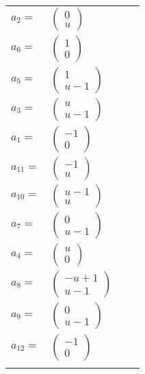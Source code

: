 \documentclass[1p]{elsarticle_modified}
\theoremstyle{definition}
\begin{document}
\begin{tabular}{m{7pt} m{180pt} m{7pt} m{180pt} }
\flushright $a_{2}=$&$\begin{pmatrix}0\\u\end{pmatrix}$ \\
\flushright $a_{6}=$&$\begin{pmatrix}1\\0\end{pmatrix}$ \\
\flushright $a_{5}=$&$\begin{pmatrix}1\\u-1\end{pmatrix}$ \\
\flushright $a_{3}=$&$\begin{pmatrix}u\\u-1\end{pmatrix}$ \\
\flushright $a_{1}=$&$\begin{pmatrix}-1\\0\end{pmatrix}$ \\
\flushright $a_{11}=$&$\begin{pmatrix}-1\\u\end{pmatrix}$ \\
\flushright $a_{10}=$&$\begin{pmatrix}u-1\\u\end{pmatrix}$ \\
\flushright $a_{7}=$&$\begin{pmatrix}0\\u-1\end{pmatrix}$ \\
\flushright $a_{4}=$&$\begin{pmatrix}u\\0\end{pmatrix}$ \\
\flushright $a_{8}=$&$\begin{pmatrix}- u+1\\u-1\end{pmatrix}$ \\
\flushright $a_{9}=$&$\begin{pmatrix}0\\u-1\end{pmatrix}$ \\
\flushright $a_{12}=$&$\begin{pmatrix}-1\\0\end{pmatrix}$\\&\end{tabular}
\end{document}
